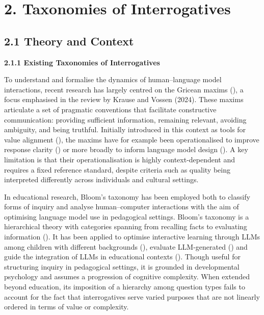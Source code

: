 \documentclass[
  12pt,
]{article}
\begin{document}
\section{2. Taxonomies of Interrogatives}\label{taxonomies-of-interrogatives}

\subsection{2.1 Theory and Context}\label{theory-and-context}

\textbf{2.1.1 Existing Taxonomies of Interrogatives}

To understand and formalise the dynamics of human--language model interactions, recent research has largely centred on the Gricean maxims (), a focus emphasised in the review by Krause and Vossen (2024). These maxims articulate a set of pragmatic conventions that facilitate constructive communication: providing sufficient information, remaining relevant, avoiding ambiguity, and being truthful. Initially introduced in this context as tools for value alignment (), the maxims have for example been operationalised to improve response clarity () or more broadly to inform language model design (). A key limitation is that their operationalisation is highly context-dependent and requires a fixed reference standard, despite criteria such as quality being interpreted differently across individuals and cultural settings.

In educational research, Bloom's taxonomy has been employed both to classify forms of inquiry and analyse human--computer interactions with the aim of optimising language model use in pedagogical settings. Bloom's taxonomy is a hierarchical theory with categories spanning from recalling facts to evaluating information (). It has been applied to optimise interactive learning through LLMs among children with different backgrounds (), evaluate LLM-generated () and guide the integration of LLMs in educational contexts (). Though useful for structuring inquiry in pedagogical settings, it is grounded in developmental psychology and assumes a progression of cognitive complexity. When extended beyond education, its imposition of a hierarchy among question types fails to account for the fact that interrogatives serve varied purposes that are not linearly ordered in terms of value or complexity.
\end{document}
